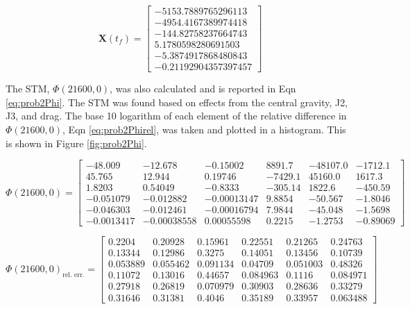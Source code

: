 \documentclass[11pt]{article}
\begin{document}
\begin{equation}
	\label{eq:prob2posvel}
	\mathbf{X}(t_f) = \begin{bmatrix}
	-5153.7889765296113 \\
	-4954.4167389974418 \\
	-144.82758237664743 \\
	 5.1780598280691503 \\
	-5.3874917868480843 \\
	-0.21192904357397457	
	\end{bmatrix}
\end{equation}

The STM, $\Phi(21600,0)$, was also calculated and is reported in Eqn \eqref{eq:prob2Phi}. The STM was found based on effects from the central gravity, J2, J3, and drag. The base 10 logarithm of each element of the relative difference in $\Phi(21600,0)$, Eqn \eqref{eq:prob2Phirel}, was taken and plotted in a histogram. This is shown in Figure \ref{fig:prob2Phi}.

\begin{equation}
\label{eq:prob2Phi}
\Phi(21600,0) = \left[\begin{array}{cccccc} -48.009 & -12.678 & -0.15002 & 8891.7 & -48107.0 & -1712.1\\ 45.765 & 12.944 & 0.19746 & -7429.1 & 45160.0 & 1617.3\\ 1.8203 & 0.54049 & -0.8333 & -305.14 & 1822.6 & -450.59\\ -0.051079 & -0.012882 & -0.00013147 & 9.8854 & -50.567 & -1.8046\\ -0.046303 & -0.012461 & -0.00016794 & 7.9844 & -45.048 & -1.5698\\ -0.0013417 & -0.00038558 & 0.00055598 & 0.2215 & -1.2753 & -0.89069 \end{array}\right]
\end{equation}

\begin{equation}
\label{eq:prob2Phirel}
\Phi(21600,0)_{\text{rel. err.}} = \left[\begin{array}{cccccc} 0.2204 & 0.20928 & 0.15961 & 0.22551 & 0.21265 & 0.24763\\ 0.13344 & 0.12986 & 0.3275 & 0.14051 & 0.13456 & 0.10739\\ 0.053889 & 0.055462 & 0.091134 & 0.04709 & 0.051003 & 0.48326\\ 0.11072 & 0.13016 & 0.44657 & 0.084963 & 0.1116 & 0.084971\\ 0.27918 & 0.26819 & 0.070979 & 0.30903 & 0.28636 & 0.33279\\ 0.31646 & 0.31381 & 0.4046 & 0.35189 & 0.33957 & 0.063488 \end{array}\right]
\end{equation}
\end{document}
